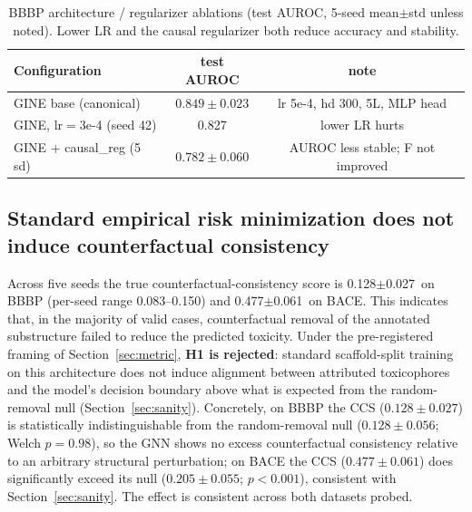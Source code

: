 \documentclass[journal]{IEEEtran}
\newcommand{\Fcausalstd}{0.128} \newcommand{\Fcausalstdsd}{0.027} %
\newcommand{\BACEcausalstd}{0.477} \newcommand{\BACEcausalstdsd}{0.061} %
\begin{document}
\begin{table}[t]
\centering
\caption{BBBP architecture / regularizer ablations (test AUROC, 5-seed mean$\pm$std unless noted). Lower LR and the causal regularizer both reduce accuracy and stability.}
\label{tab:abl}
\begin{tabular}{lcc}
\toprule
Configuration & test AUROC & note \\
\midrule
GINE base (canonical) & $0.849\pm0.023$ & lr 5e-4, hd 300, 5L, MLP head \\
GINE, lr$=$3e-4 (seed 42) & 0.827 & lower LR hurts \\
GINE + causal\_reg (5 sd) & $0.782\pm0.060$ & AUROC less stable; F not improved \\
\bottomrule
\end{tabular}
\end{table}

\subsection{Standard empirical risk minimization does not induce counterfactual consistency}
\label{sec:nullres}
Across five seeds the true counterfactual-consistency score is
\Fcausalstd$\pm$\Fcausalstdsd\ on BBBP (per-seed range 0.083--0.150) and
\BACEcausalstd$\pm$\BACEcausalstdsd\ on BACE. This indicates that, in the majority
of valid cases, counterfactual removal of the annotated substructure failed to
reduce the predicted toxicity. Under the pre-registered framing of
Section~\ref{sec:metric}, \textbf{H1 is rejected}: standard scaffold-split
training on this architecture does not induce alignment between attributed
toxicophores and the model's decision boundary above what is expected from the
random-removal null (Section~\ref{sec:sanity}). Concretely, on BBBP the CCS
($0.128\pm0.027$) is statistically indistinguishable from the random-removal null
($0.128\pm0.056$; Welch $p=0.98$), so the GNN shows no excess counterfactual
consistency relative to an arbitrary structural perturbation; on BACE the CCS
($0.477\pm0.061$) does significantly exceed its null ($0.205\pm0.055$;
$p<0.001$), consistent with Section~\ref{sec:sanity}. The effect is consistent
across both datasets probed.
\end{document}

